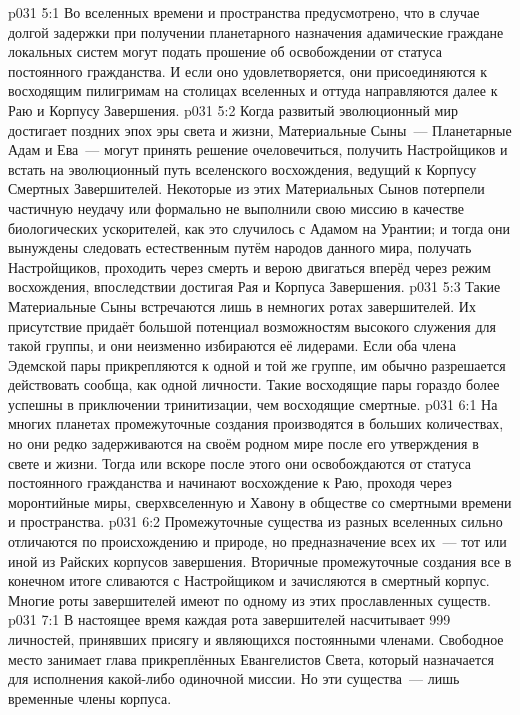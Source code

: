 \vs p031 5:1 Во вселенных времени и пространства предусмотрено, что в случае долгой задержки при получении планетарного назначения адамические граждане локальных систем могут подать прошение об освобождении от статуса постоянного гражданства. И если оно удовлетворяется, они присоединяются к восходящим пилигримам на столицах вселенных и оттуда направляются далее к Раю и Корпусу Завершения.
\vs p031 5:2 Когда развитый эволюционный мир достигает поздних эпох эры света и жизни, Материальные Сыны~--- Планетарные Адам и Ева~--- могут принять решение очеловечиться, получить Настройщиков и встать на эволюционный путь вселенского восхождения, ведущий к Корпусу Смертных Завершителей. Некоторые из этих Материальных Сынов потерпели частичную неудачу или формально не выполнили свою миссию в качестве биологических ускорителей, как это случилось с Адамом на Урантии; и тогда они вынуждены следовать естественным путём народов данного мира, получать Настройщиков, проходить через смерть и верою двигаться вперёд через режим восхождения, впоследствии достигая Рая и Корпуса Завершения.
\vs p031 5:3 Такие Материальные Сыны встречаются лишь в немногих ротах завершителей. Их присутствие придаёт большой потенциал возможностям высокого служения для такой группы, и они неизменно избираются её лидерами. Если оба члена Эдемской пары прикрепляются к одной и той же группе, им обычно разрешается действовать сообща, как одной личности. Такие восходящие пары гораздо более успешны в приключении тринитизации, чем восходящие смертные.
\vs p031 6:1 На многих планетах промежуточные создания производятся в больших количествах, но они редко задерживаются на своём родном мире после его утверждения в свете и жизни. Тогда или вскоре после этого они освобождаются от статуса постоянного гражданства и начинают восхождение к Раю, проходя через моронтийные миры, сверхвселенную и Хавону в обществе со смертными времени и пространства.
\vs p031 6:2 Промежуточные существа из разных вселенных сильно отличаются по происхождению и природе, но предназначение всех их~--- тот или иной из Райских корпусов завершения. Вторичные промежуточные создания все в конечном итоге сливаются с Настройщиком и зачисляются в смертный корпус. Многие роты завершителей имеют по одному из этих прославленных существ.
\vs p031 7:1 В настоящее время каждая рота завершителей насчитывает 999 личностей, принявших присягу и являющихся постоянными членами. Свободное место занимает глава прикреплённых Евангелистов Света, который назначается для исполнения какой\hyp{}либо одиночной миссии. Но эти существа~--- лишь временные члены корпуса.
